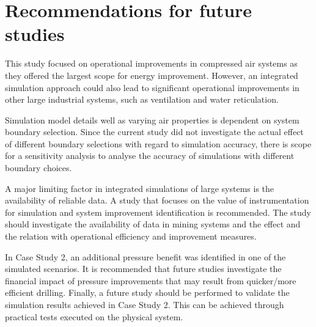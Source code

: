	 \section{Recommendations for future studies}
	 This study focused on operational improvements in compressed air systems as they offered the largest scope for energy improvement. However, an integrated simulation approach could also lead to significant operational improvements in other large industrial systems, such as ventilation and water reticulation.
	 \par
	 \clearpage
	 Simulation model details well as varying air properties is dependent on system boundary selection. Since the current study did not investigate the actual effect of different boundary selections with regard to simulation accuracy, there is scope for a sensitivity analysis to analyse the accuracy of simulations with different boundary choices.
	 \par
	 A major limiting factor in integrated simulations of large systems is the availability of reliable data. A study that focuses on the value of instrumentation for simulation and system improvement identification is recommended. The study should investigate the availability of data in mining systems and the effect and the  relation with operational efficiency and improvement measures.
	 \par 
	 In Case Study 2, an additional pressure benefit was identified in one of the simulated scenarios. It is recommended that future studies investigate the financial impact of pressure improvements that may result from quicker/more efficient drilling. Finally, a future study should be performed to validate the simulation results achieved in Case Study 2. This can be achieved through practical tests executed on the physical system.
